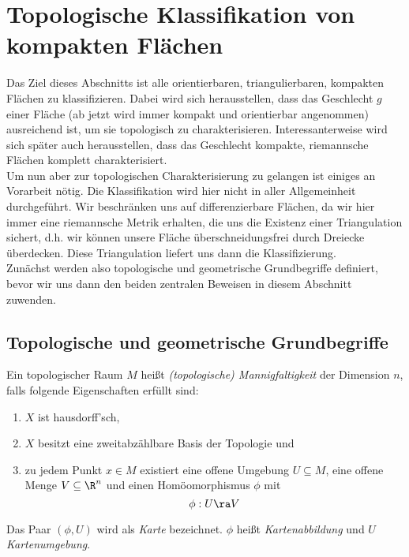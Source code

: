 \section{Topologische Klassifikation von kompakten Flächen}

Das Ziel dieses Abschnitts ist alle orientierbaren, triangulierbaren, kompakten Flächen zu klassifizieren. Dabei wird sich herausstellen, dass das Geschlecht $g$ einer Fläche (ab jetzt wird immer kompakt und orientierbar angenommen) ausreichend ist, um sie topologisch zu charakterisieren. Interessanterweise wird sich später auch herausstellen, dass das Geschlecht kompakte, riemannsche Flächen komplett charakterisiert. \\
Um nun aber zur topologischen Charakterisierung zu gelangen ist einiges an Vorarbeit nötig. Die Klassifikation wird hier nicht in aller Allgemeinheit durchgeführt. Wir beschränken uns auf differenzierbare Flächen, da wir hier immer eine riemannsche Metrik erhalten, die uns die Existenz einer Triangulation sichert, d.h. wir können unsere Fläche überschneidungsfrei durch Dreiecke überdecken. Diese Triangulation liefert uns dann die Klassifizierung. \\
Zunächst werden also topologische und geometrische Grundbegriffe definiert, bevor wir uns dann den beiden zentralen Beweisen in diesem Abschnitt zuwenden.

\subsection{Topologische und geometrische Grundbegriffe}

\begin{defin}[Mannigfaltigkeit]
  Ein topologischer Raum $M$ heißt \emph{(topologische) Mannigfaltigkeit} der Dimension $n$, falls folgende Eigenschaften erfüllt sind:
  \begin{enumerate}
    \item $X$ ist hausdorff'sch,
    \item $X$ besitzt eine zweitabzählbare Basis der Topologie und
    \item zu jedem Punkt $x \in M$ existiert eine offene Umgebung $U\subseteq M$, eine offene Menge $V\subseteq \R^n$ und einen Homöomorphismus $\phi$ mit
      \[
      \phi: U \ra V
      \]
  \end{enumerate}
  Das Paar $(\phi, U)$ wird als \emph{Karte} bezeichnet. $\phi$ heißt \emph{Kartenabbildung} und $U$ \emph{Kartenumgebung}.
\end{defin}

